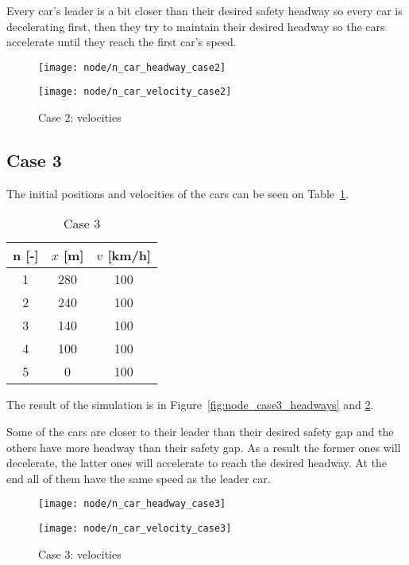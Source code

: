 		Every car's leader is a bit closer than their desired safety headway so every car is decelerating first, then they try to maintain their desired headway so the cars accelerate until they reach the first car's speed.
		\begin{figure}
			\centering
			\begin{minipage}{.5\textwidth}
				\centering
				\texttt{[image: node/n\_car\_headway\_case2]}
				\caption{Case 2: headways}
				\label{fig:node_case2_headways}
			\end{minipage}\hfill
			\begin{minipage}{.5\textwidth}
				\centering
				\texttt{[image: node/n\_car\_velocity\_case2]}
				\caption{Case 2: velocities}
				\label{fig:node_case2_velocities}
			\end{minipage}
		\end{figure}
		\subsection*{Case 3}
		The initial positions and velocities of the cars can be seen on Table~\ref{tab:node_case3}.
		\begin{table}
			\centering
			\begin{tabular}{ |c|c|c| }
				\hline
				n [-] & $x$ [m] & $v$ [km/h]\\
				\hline
				1 & 280 & 100 \\
				2 & 240 & 100 \\
				3 & 140 & 100 \\
				4 & 100 & 100 \\
				5 & 0 & 100 \\
				\hline
			\end{tabular}
			\caption{Case 3}
			\label{tab:node_case3}
		\end{table}
		The result of the simulation is in Figure~\ref{fig:node_case3_headways} and \ref{fig:node_case3_velocities}. 

		Some of the cars are closer to their leader than their desired safety gap and the others have more headway than their safety gap. As a result the former ones will decelerate, the latter ones will accelerate to reach the desired headway. At the end all of them have the same speed as the leader car.
		\begin{figure}
			\centering
			\begin{minipage}{.5\textwidth}
				\centering
				\texttt{[image: node/n\_car\_headway\_case3]}
				\caption{Case 3: headways}
				\label{fig:node_case3_headways}
			\end{minipage}\hfill
			\begin{minipage}{.5\textwidth}
				\centering
				\texttt{[image: node/n\_car\_velocity\_case3]}
				\caption{Case 3: velocities}
				\label{fig:node_case3_velocities}
			\end{minipage}
		\end{figure}
